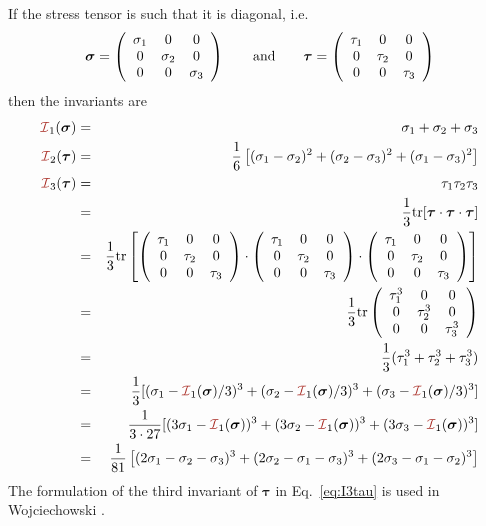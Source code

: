 If the stress tensor is such that it is diagonal, i.e.
\[
{\bm \sigma}= \left( \begin{array}{ccc}
\sigma_1 & 0 & 0 \\
0 & \sigma_2 & 0 \\
0 & 0 & \sigma_3
\end{array}\right)
\qquad
{\rm and}
\qquad
{\bm \tau}= \left( \begin{array}{ccc}
\tau_1 & 0 & 0 \\
0 & \tau_2 & 0 \\
0 & 0 & \tau_3
\end{array}\right)
\]
then the invariants are 
\begin{eqnarray}
{\III}_1({\bm \sigma}) &=& \sigma_1 + \sigma_2+ \sigma_3 \nonumber\\
{\III}_2({\bm \tau}) &=& \frac{1}{6}\left[(\sigma_{1}-\sigma_{2})^2 + (\sigma_{2}-\sigma_{3})^2 
+ (\sigma_{1}-\sigma_{3})^2 \right] \label{eq:I2s123}\\ 
{\III}_3({\bm \tau}) 
&=& \tau_1\tau_2\tau_3 \nn\\
&=& \frac{1}{3} {\rm tr}[{\bm \tau}\cdot{\bm \tau}\cdot {\bm \tau}]  \nn\\
&=& \frac{1}{3} {\rm tr}
\left[
\left(
\begin{array}{ccc}
\tau_1 & 0 & 0 \\
0 & \tau_2 & 0 \\
0 & 0 & \tau_3 
\end{array}
\right)
\cdot
\left(
\begin{array}{ccc}
\tau_1 & 0 & 0 \\
0 & \tau_2 & 0 \\
0 & 0 & \tau_3 
\end{array}
\right)
\cdot
\left(
\begin{array}{ccc}
\tau_1 & 0 & 0 \\
0 & \tau_2 & 0 \\
0 & 0 & \tau_3 
\end{array}
\right)
\right] \nn\\
&=&  \frac{1}{3} {\rm tr}
\left(
\begin{array}{ccc}
\tau_1^3 & 0 & 0 \\
0 & \tau_2^3 & 0 \\
0 & 0 & \tau_3^3 
\end{array}
\right) \nn\\
&=& \frac{1}{3}(\tau_1^3+\tau_2^3+\tau_3^3) \nn\\
&=&  \frac{1}{3} [ 
(\sigma_1-{\III}_1({\bm \sigma})/3)^3+  
(\sigma_2-{\III}_1({\bm \sigma})/3)^3+
(\sigma_3-{\III}_1({\bm \sigma})/3)^3 ]   \nonumber\\ 
&=&  \frac{1}{3\cdot 27} [ 
(3\sigma_1-{\III}_1({\bm \sigma}))^3+  
(3\sigma_2-{\III}_1({\bm \sigma}))^3+
(3\sigma_3-{\III}_1({\bm \sigma}))^3 ]   \nonumber\\ 
&=& \frac{1}{81}
\left[
(2\sigma_1-\sigma_2-\sigma_3)^3+
(2\sigma_2-\sigma_1-\sigma_3)^3+
(2\sigma_3-\sigma_1-\sigma_2)^3
\right] 
\label{eq:3rdinvb} \label{eq:I3tau}
\end{eqnarray}
The formulation of the third invariant of ${\bm \tau}$  in Eq.~\ref{eq:I3tau} 
is used in Wojciechowski \cite{wojc18}.











